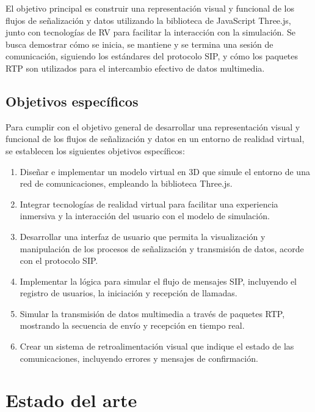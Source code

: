 \documentclass[a4paper, 12pt]{book}
\begin{document}
El objetivo principal es construir una representación visual y funcional de los flujos de señalización y 
datos utilizando la biblioteca de JavaScript Three.js, junto con tecnologías de RV para facilitar la interacción con la simulación. 
Se busca demostrar cómo se inicia, se mantiene y se termina una sesión de comunicación, siguiendo los estándares del protocolo SIP, 
y cómo los paquetes RTP son utilizados para el intercambio efectivo de datos multimedia.


\section{Objetivos específicos}
\label{sec:objetivos-especificos}
Para cumplir con el objetivo general de desarrollar una representación visual y funcional de los flujos de señalización 
y datos en un entorno de realidad virtual, se establecen los siguientes objetivos específicos:

\begin{enumerate}
\item Diseñar e implementar un modelo virtual en 3D que simule el entorno de una red de comunicaciones, empleando la biblioteca Three.js.
\item Integrar tecnologías de realidad virtual para facilitar una experiencia inmersiva y 
la interacción del usuario con el modelo de simulación.
\item Desarrollar una interfaz de usuario que permita la visualización y manipulación de los procesos de 
señalización y transmisión de datos, acorde con el protocolo SIP.
\item Implementar la lógica para simular el flujo de mensajes SIP, incluyendo el registro de usuarios, la iniciación y 
recepción de llamadas.
\item Simular la transmisión de datos multimedia a través de paquetes RTP, mostrando la secuencia de envío y recepción en tiempo real.
\item Crear un sistema de retroalimentación visual que indique el estado de las comunicaciones, incluyendo errores y mensajes de confirmación.
\end{enumerate}



\cleardoublepage
\chapter{Estado del arte}
\label{chap:estado}
\end{document}

